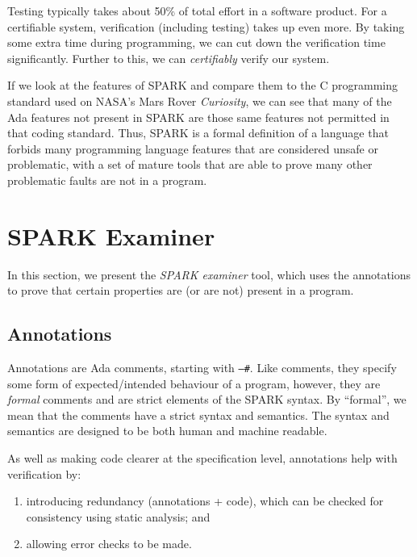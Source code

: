 Testing typically takes about 50\% of total effort in a software product. For a certifiable system, verification (including testing) takes up even more. By taking some extra time during programming, we can cut down the verification time significantly. Further to this, we can \emph{certifiably} verify our system.

If we look at the features of SPARK and compare them to the C programming standard used on NASA's Mars Rover \emph{Curiosity}, we can see that many of the Ada features not present in SPARK are those same features not permitted in that coding standard. Thus, SPARK is a formal definition of a language that forbids many programming language features that are considered unsafe or problematic, with a set of mature tools that are able to prove many other problematic faults are not in a program.


\section{SPARK Examiner}

In this section, we present the \emph{SPARK examiner} tool, which uses the annotations to prove that certain properties are (or are not) present in a program.

\subsection{Annotations}

Annotations are Ada comments, starting with \texttt{--\#}. Like comments, they specify some form of expected/intended behaviour of a program, however, they are \emph{formal} comments and are strict elements of the SPARK syntax. By ``formal'', we mean that the comments have a strict syntax and semantics. The syntax and semantics are designed to be both human and machine readable.

As well as making code clearer at the specification level, annotations help with verification by:

\begin{enumerate}

 \item introducing redundancy (annotations + code), which can be checked for consistency using static analysis; and

 \item allowing error checks to be made.

\end{enumerate}

